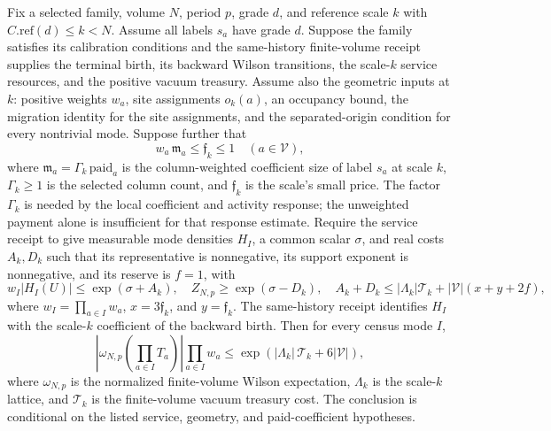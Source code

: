\begin{theorem}\label{thm:ex-selected-birth-moment}
Fix a selected family, volume $N$, period $p$, grade $d$, and reference scale $k$ with $C.\mathrm{ref}(d)\leq k<N$. Assume all labels $s_a$ have grade $d$. Suppose the family satisfies its calibration conditions and the same-history finite-volume receipt supplies the terminal birth, its backward Wilson transitions, the scale-$k$ service resources, and the positive vacuum treasury. Assume also the geometric inputs at $k$: positive weights $w_a$, site assignments $o_k(a)$, an occupancy bound, the migration identity for the site assignments, and the separated-origin condition for every nontrivial mode. Suppose further that
\[
 w_a\,\mathfrak m_a\leq \mathfrak f_k\leq1\quad(a\in\mathcal V),
\]
where $\mathfrak m_a=\Gamma_k\,\mathrm{paid}_a$ is the column-weighted coefficient size of label $s_a$ at scale $k$, $\Gamma_k\geq1$ is the selected column count, and $\mathfrak f_k$ is the scale's small price. The factor $\Gamma_k$ is needed by the local coefficient and activity response; the unweighted payment alone is insufficient for that response estimate. Require the service receipt to give measurable mode densities $H_I$, a common scalar $\sigma$, and real costs $A_k,D_k$ such that its representative is nonnegative, its support exponent is nonnegative, and its reserve is $f=1$, with
\[
 w_I|H_I(U)|\leq \exp(\sigma+A_k),\quad
 Z_{N,p}\geq\exp(\sigma-D_k),\quad
 A_k+D_k\leq |\Lambda_k|\mathcal T_k+|\mathcal V|(x+y+2f),
\]
where $w_I=\prod_{a\in I}w_a$, $x=3\mathfrak f_k$, and $y=\mathfrak f_k$. The same-history receipt identifies $H_I$ with the scale-$k$ coefficient of the backward birth. Then for every census mode $I$,
\[
 \left|\omega_{N,p}\!\left(\prod_{a\in I}T_a\right)\right|
 \prod_{a\in I}w_a
 \leq \exp\!\left( |\Lambda_k|\,\mathcal T_k+6|\mathcal V|\right),
 \label{ex-selected-birth-bound}
\]
where $\omega_{N,p}$ is the normalized finite-volume Wilson expectation, $\Lambda_k$ is the scale-$k$ lattice, and $\mathcal T_k$ is the finite-volume vacuum treasury cost. The conclusion is conditional on the listed service, geometry, and paid-coefficient hypotheses.
\end{theorem}

